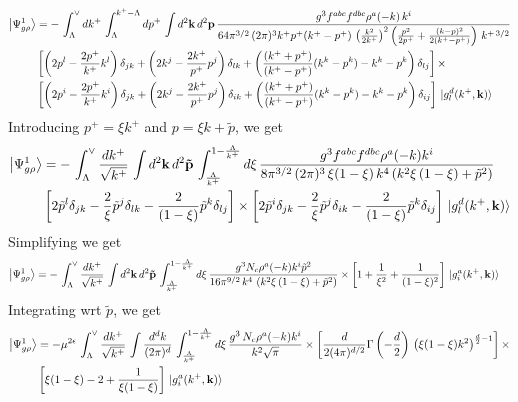 \documentclass[10pt]{article}
\numberwithin{equation}{section}
\begin{document}
\begin{align}
    \left|\Psi_{g\rho}^{1}\right\rangle & = -\, \int_{\Lambda}^{\vee} dk^{+}\, \int_{\Lambda}^{k^{+}-\Lambda} dp^{+}\, \int d^{2}\mathbf{k}\, d^{2}\mathbf{p}\,\frac{g^{3}f^{abc}f^{dbc}\rho^{a}(-k)\,k^{i}}{64\pi^{3/2}\,(2\pi)^{3}k^{+}p^{+}(k^{+}-p^{+})\,\left(\frac{k^{2}}{2k^{+}}\right)^{2}\left(\frac{p^{2}}{2p^{+}}+\frac{(k-p)^{2}}{2(k^{+}-p^{+})}\right)\,k^{+\,3/2}}\notag \\ & \left[\left(2p^{l}-\frac{2p^{+}}{k^{+}}k^{l}\right)\delta_{jk}+\left(2k^{j}-\frac{2k^{+}}{p^{+}} p^{j}\right)\delta_{lk}+\left(\frac{(k^{+}+p^{+})}{(k^{+}-p^{+})}(k^{k}-p^{k})-k^{k}-p^{k}\right)\delta_{lj}\right]\times \notag \\ & \left[\left(2p^{i}-\frac{2p^{+}}{k^{+}}k^{i}\right)\delta_{jk}+\left(2k^{j}-\frac{2k^{+}}{p^{+}} p^{j}\right)\delta_{ik}+\left(\frac{(k^{+}+p^{+})}{(k^{+}-p^{+})}(k^{k}-p^{k})-k^{k}-p^{k}\right)\delta_{ij}\right]\, \ket{g^{d}_{l}(k^{+},\mathbf{k})}
\end{align}
Introducing $p^{+} = \xi k^{+}$ and $p = \xi k +\tilde{p}$, we get
\begin{align}
    \left|\Psi_{g\rho}^{1}\right\rangle & = -\, \int_{\Lambda}^{\vee} \frac{dk^{+}}{\sqrt{k^{+}}}\,\int d^{2}\mathbf{k}\, d^{2}\mathbf{\tilde{p}}\, \int_{\frac{\Lambda}{k^{+}}}^{1-\frac{\Lambda}{k^{+}}} d\xi\, \frac{g^{3}f^{abc}f^{dbc}\rho^{a}(-k)k^{i}}{8\pi^{3/2}\,(2\pi)^{3}\, \xi(1-\xi)\,k^{4}\left(k^{2}\xi\,(1-\xi)+\tilde{p}^{2}\right)}\notag \\ & \left[2\tilde{p}^{l}\delta_{jk}-\frac{2}{\xi}\tilde{p}^{j}\delta_{lk}-\frac{2}{(1-\xi)}\tilde{p}^{k}\delta_{lj}\right] \times \left[2\tilde{p}^{i}\delta_{jk}-\frac{2}{\xi}\tilde{p}^{j}\delta_{ik}-\frac{2}{(1-\xi)}\tilde{p}^{k}\delta_{ij}\right]\, \ket{g^{d}_{l}(k^{+},\mathbf{k})}
\end{align}
Simplifying we get
\begin{align}
     \left|\Psi_{g\rho}^{1}\right\rangle & = -\, \int_{\Lambda}^{\vee} \frac{dk^{+}}{\sqrt{k^{+}}}\,\int d^{2}\mathbf{k}\, d^{2}\mathbf{\tilde{p}}\, \int_{\frac{\Lambda}{k^{+}}}^{1-\frac{\Lambda}{k^{+}}} d\xi\, \frac{g^{3}N_{c}\rho^{a}(-k)k^{i}\tilde{p}^{2}}{16\pi^{9/2}\, k^{4}\,\left(k^{2}\xi\,(1-\xi)+\tilde{p}^{2}\right)}\times \left[1+\frac{1}{\xi^{2}}+\frac{1}{(1-\xi)^{2}}\right]\,\ket{g^{a}_{i}(k^{+},\mathbf{k})}
\end{align}
Integrating wrt $\tilde{p}$, we get
\begin{align}
    \left|\Psi_{g\rho}^{1}\right\rangle & = -\mu^{2\epsilon}\, \int_{\Lambda}^{\vee} \frac{dk^{+}}{\sqrt{k^{+}}} \, \int \frac{d^{d}k}{(2\pi)^{d}}\, \int_{\frac{\Lambda}{k^{+}}}^{1-\frac{\Lambda}{k^{+}}} d\xi\, \frac{g^{3}\,N_{c}\rho^{a}(-k) k^{i}}{k^{2}\sqrt{\pi}}\times \left[\frac{d}{2(4\pi)^{d/2}}\Gamma\left(-\frac{d}{2}\right)\,\left(\xi(1-\xi)k^{2}\right)^{\frac{d}{2}-1}\right]\times\notag \\ &  \left[\xi(1-\xi)-2+\frac{1}{\xi(1-\xi)}\right]\,\ket{g^{a}_{i}(k^{+},\mathbf{k})}
\end{align}
\end{document}

